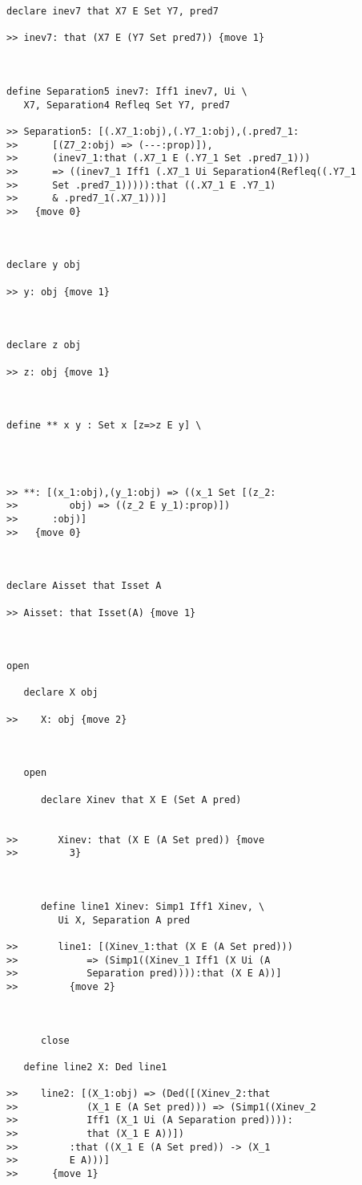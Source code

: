 \documentclass[12pt]{article}
\begin{document}
\begin{verbatim}
declare inev7 that X7 E Set Y7, pred7

>> inev7: that (X7 E (Y7 Set pred7)) {move 1}



define Separation5 inev7: Iff1 inev7, Ui \
   X7, Separation4 Refleq Set Y7, pred7

>> Separation5: [(.X7_1:obj),(.Y7_1:obj),(.pred7_1:
>>      [(Z7_2:obj) => (---:prop)]),
>>      (inev7_1:that (.X7_1 E (.Y7_1 Set .pred7_1)))
>>      => ((inev7_1 Iff1 (.X7_1 Ui Separation4(Refleq((.Y7_1
>>      Set .pred7_1))))):that ((.X7_1 E .Y7_1)
>>      & .pred7_1(.X7_1)))]
>>   {move 0}



declare y obj

>> y: obj {move 1}



declare z obj

>> z: obj {move 1}



define ** x y : Set x [z=>z E y] \
   



>> **: [(x_1:obj),(y_1:obj) => ((x_1 Set [(z_2:
>>         obj) => ((z_2 E y_1):prop)])
>>      :obj)]
>>   {move 0}



declare Aisset that Isset A

>> Aisset: that Isset(A) {move 1}



open

   declare X obj

>>    X: obj {move 2}



   open

      declare Xinev that X E (Set A pred)


>>       Xinev: that (X E (A Set pred)) {move
>>         3}



      define line1 Xinev: Simp1 Iff1 Xinev, \
         Ui X, Separation A pred

>>       line1: [(Xinev_1:that (X E (A Set pred)))
>>            => (Simp1((Xinev_1 Iff1 (X Ui (A
>>            Separation pred)))):that (X E A))]
>>         {move 2}



      close

   define line2 X: Ded line1

>>    line2: [(X_1:obj) => (Ded([(Xinev_2:that
>>            (X_1 E (A Set pred))) => (Simp1((Xinev_2
>>            Iff1 (X_1 Ui (A Separation pred)))):
>>            that (X_1 E A))])
>>         :that ((X_1 E (A Set pred)) -> (X_1
>>         E A)))]
>>      {move 1}




\end{verbatim}
\end{document}
